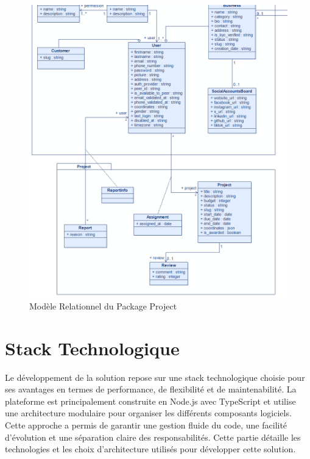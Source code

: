 {\begin{figure}[H]
\begin{center}
\includegraphics[width=15cm]{assets/diagrams/ProjectUC.png}
\end{center}
\caption{Modèle Relationnel du Package Project}
\end{figure}

\vspace{0.35cm}

\section{Stack Technologique}
Le développement de la solution repose sur une stack technologique choisie pour ses avantages en termes de performance, de flexibilité et de maintenabilité. La plateforme est principalement construite en Node.js avec TypeScript et utilise une architecture modulaire pour organiser les différents composants logiciels. Cette approche a permis de garantir une gestion fluide du code, une facilité d'évolution et une séparation claire des responsabilités. Cette partie détaille les technologies et les choix d'architecture utilisés pour développer cette solution.

}
